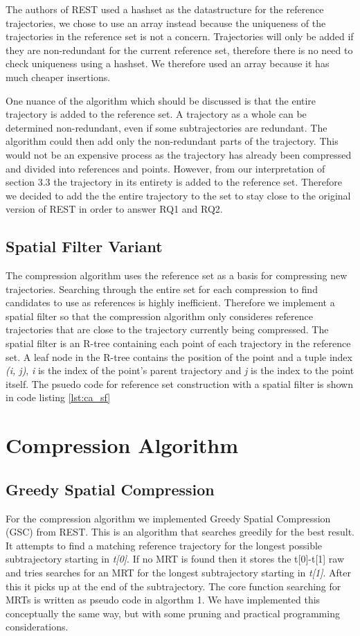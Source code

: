 The authors of REST used a hashset as the datastructure for the reference trajectories, we chose to use an array instead because the uniqueness of the trajectories in the reference set is not a concern. Trajectories will only be added if they are non-redundant for the current reference set, therefore there is no need to check uniqueness using a hashset. We therefore used an array because it has much cheaper insertions.

One nuance of the algorithm which should be discussed is that the entire trajectory is added to the reference set. A trajectory as a whole can be determined non-redundant, even if some subtrajectories are redundant. The algorithm could then add only the non-redundant parts of the trajectory. This would not be an expensive process as the trajectory has already been compressed and divided into references and points. However, from our interpretation of \cite{zhao2018rest} section 3.3 the trajectory in its entirety is added to the reference set. Therefore we decided to add the the entire trajectory to the set to stay close to the original version of REST in order to answer RQ1 and RQ2.

\subsection{Spatial Filter Variant}

The compression algorithm uses the reference set as a basis for compressing new trajectories. Searching through the entire set for each compression to find candidates to use as references is highly inefficient. Therefore we implement a spatial filter so that the compression algorithm only consideres reference trajectories that are close to the trajectory currently being compressed. The spatial filter is an R-tree containing each point of each trajectory in the reference set. A leaf node in the R-tree contains the position of the point and a tuple index \textit{(i, j)}, \textit{i} is the index of the point's parent trajectory and \textit{j} is the index to the point itself. The psuedo code for reference set construction with a spatial filter is shown in code listing \ref{lst:ca_sf}

\section{Compression Algorithm}
\subsection{Greedy Spatial Compression}
For the compression algorithm we implemented Greedy Spatial Compression (GSC) from REST. This is an algorithm that searches greedily for the best result. It attempts to find a matching reference trajectory for the longest possible subtrajectory starting in \textit{t[0]}. If no MRT is found then it stores the t[0]-t[1] raw and tries searches for an MRT for the longest subtrajectory starting in \textit{t[1]}. After this it picks up at the end of the subtrajectory. The core function searching for MRTs is written as pseudo code in \cite{zhao2018rest} algorthm 1. We have implemented this conceptually the same way, but with some pruning and practical programming considerations.


